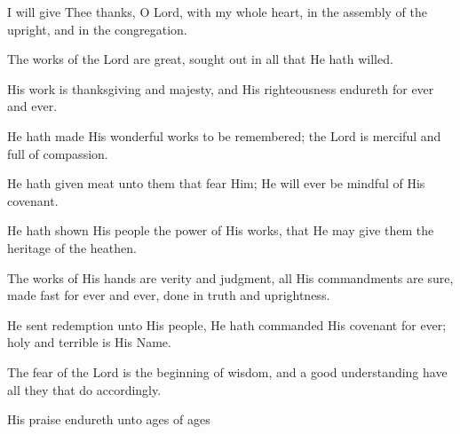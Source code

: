I will give Thee thanks, O Lord, with my whole heart, in the assembly of the upright, and in the congregation.

The works of the Lord are great, sought out in all that He hath willed.

His work is thanksgiving and majesty, and His righteousness endureth for ever and ever.

He hath made His wonderful works to be remembered; the Lord is merciful and full of compassion.

He hath given meat unto them that fear Him; He will ever be mindful of His covenant.

He hath shown His people the power of His works, that He may give them the heritage of the heathen.

The works of His hands are verity and judgment, all His commandments are sure, made fast for ever and ever, done in truth and uprightness.

He sent redemption unto His people, He hath commanded His covenant for ever; holy and terrible is His Name.

The fear of the Lord is the beginning of wisdom, and a good understanding have all they that do accordingly.

His praise endureth unto ages of ages
